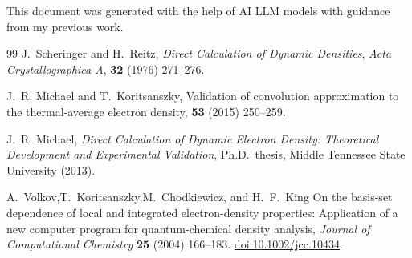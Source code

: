 \documentclass{article}
\begin{document}
This document was generated with the help of AI LLM models with guidance
from my previous work.

\begin{thebibliography}{99}
J.\ Scheringer and H.\ Reitz,
\emph{Direct Calculation of Dynamic Densities},
\textit{Acta Crystallographica A}, \textbf{32} (1976) 271–276.

J.~R. Michael and T.~Koritsanszky,
\newblock Validation of convolution approximation to the thermal-average
  electron density,
 \textbf{53} (2015) 250--259.

J.~R. Michael,
\newblock \emph{Direct Calculation of Dynamic Electron Density:  
         Theoretical Development and Experimental Validation},
\newblock Ph.D.\ thesis, Middle Tennessee State University (2013).

A.~Volkov,T.~Koritsanszky,M.~Chodkiewicz, and H.~F.~King
\newblock On the basis-set dependence of local and integrated electron-density
  properties: Application of a new computer program for quantum-chemical
  density analysis,
\newblock \emph{Journal of Computational Chemistry} \textbf{25} (2004) 166–183.
  \href{https://doi.org/10.1002/jcc.10434}{doi:10.1002/jcc.10434}.


\end{thebibliography}
\end{document}
